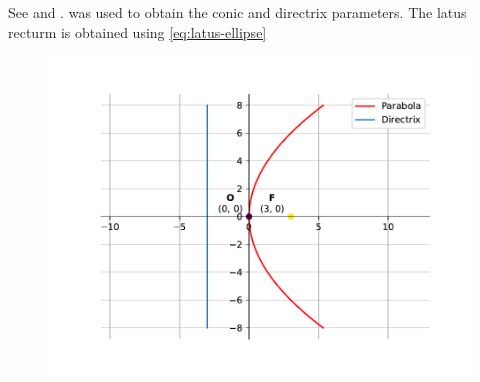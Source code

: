 See 
and 
.
	 was used to obtain the conic and directrix parameters.
			The latus recturm is obtained using \eqref{eq:latus-ellipse}
			
\begin{figure}[H]
		\begin{center}
	\includegraphics[width=0.75\columnwidth]{chapters/11/11/2/1/figs/fig.pdf}
	\end{center}
\caption{}
\label{fig:11/11/2/1Fig1}
\end{figure}

